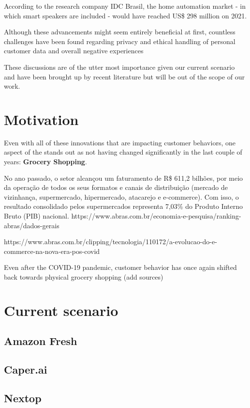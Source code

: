 \documentclass[openright]{normas-utf-tex} %
\begin{document}
According to the research company IDC Brasil, the home automation market - in
which smart speakers are included - would have reached US\$ 298 million on
2021.

Although these advancements might seem entirely beneficial at first, countless
challenges have been found regarding privacy and ethical handling of personal
customer data \cite{Echoes2022} and overall negative experiences \cite{He2019}

These discussions are of the utter most importance given our current scenario
and have been brought up by recent literature but will be out of the scope of
our work.

\section{Motivation}

Even with all of these innovations that are impacting customer behaviors, one aspect of the stands out as not having changed 
significantly in the last couple of years: \textbf{Grocery Shopping}.

No ano passado, o setor alcançou um faturamento de R\$ 611,2 bilhões, por meio
da operação de todos os seus formatos e canais de distribuição (mercado de
vizinhança, supermercado, hipermercado, atacarejo e e-commerce). Com isso, o
resultado consolidado pelos supermercados representa 7,03\% do Produto Interno
Bruto (PIB) nacional.
https://www.abras.com.br/economia-e-pesquisa/ranking-abras/dados-gerais

https://www.abras.com.br/clipping/tecnologia/110172/a-evolucao-do-e-commerce-na-nova-era-pos-covid

Even after the COVID-19 pandemic, customer behavior has once again shifted back towards physical grocery shopping (add sources)

\section{Current scenario}

\subsection{Amazon Fresh}

\subsection{Caper.ai}

\subsection{Nextop}
\end{document}
